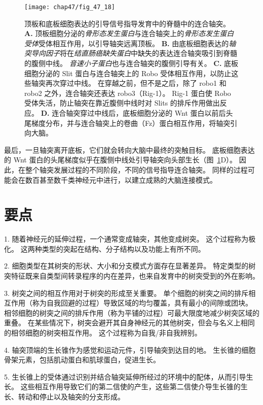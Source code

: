 \begin{figure}[htbp]
	\centering
	\texttt{[image: chap47/fig\_47\_18]}
	\caption{顶板和底板细胞表达的引导信号指导发育中的脊髓中的连合轴突。
		\textbf{A.} 顶板细胞分泌的\textit{骨形态发生蛋白}与连合轴突上的\textit{骨形态发生蛋白受体}受体相互作用，以引导轴突远离顶板。
		\textbf{B.} 由底板细胞表达的\textit{轴突导向因子}将在\textit{结直肠癌缺失蛋白}中缺失的表达连合轴突吸引到脊髓的腹侧中线。
		\textit{音速小子蛋白}也与连合轴突的腹侧引导有关。
		\textbf{C.} 底板细胞分泌的 Slit 蛋白与连合轴突上的 Robo 受体相互作用，以防止这些轴突再次穿过中线。
		在穿越之前，但不是之后，除了 robo1 和 robo2 之外，连合轴突还表达 robo3（Rig-1）。
		Rig-1 蛋白使 Robo 受体失活，防止轴突在靠近腹侧中线时对 Slits 的排斥作用做出反应。
		\textbf{D.} 连合轴突穿过中线后，底板细胞分泌的 Wnt 蛋白以前后头尾梯度分布，并与连合轴突上的卷曲（Fz）蛋白相互作用，将轴突引向大脑。}
	\label{fig:47_18}
\end{figure}


最后，一旦轴突离开底板，它们就会转向大脑中最终的突触目标。
底板细胞表达的 Wnt 蛋白的头尾梯度似乎在腹侧中线处引导轴突向头部生长（图~\ref{fig:47_18}D）。
因此，在整个轴突发展过程的不同阶段，不同的信号指导连合轴突。
同样的过程可能会在数百甚至数千类神经元中进行，以建立成熟的大脑连接模式。



\section{要点}

1. 随着神经元的延伸过程，一个通常变成轴突，其他变成树突。
这个过程称为极化。
这两种类型的突起在结构、分子结构以及功能上有所不同。 


2. 细胞类型在其树突的形状、大小和分支模式方面存在显著差异。
特定类型的树突特征既来自类型间转录程序的内在差异，也来自发育中的树突受到的外在影响。


3. 树突之间的相互作用对于树突的形成至关重要。
单个细胞的树突之间的排斥相互作用（称为自我回避的过程）导致区域的均匀覆盖，具有最小的间隙或团块。
相邻细胞的树突之间的排斥作用（称为平铺的过程）可最大限度地减少树突区域的重叠。
在某些情况下，树突会避开其自身神经元的其他树突，但会与名义上相同的相邻细胞的树突相互作用。
这个过程称为自我/非自我辨别。


4. 轴突顶端的生长锥作为感觉和运动元件，引导轴突到达目的地。
生长锥的细胞骨架元素，包括肌动蛋白和肌球蛋白，促进生长。


5. 生长锥上的受体通过识别并结合轴突延伸所经过的环境中的配体，从而引导生长。
这些相互作用导致它们的第二信使的产生，这些第二信使介导生长锥的生长、转动和停止以及轴突的分支形成。


